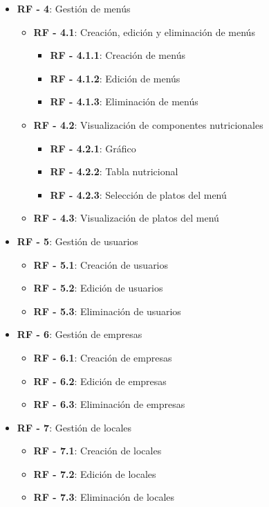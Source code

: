 \begin{itemize}
	\item \textbf{RF - 4}: Gestión de menús
	\begin{itemize}
		\item \textbf{RF - 4.1}: Creación, edición y eliminación de menús
		\begin{itemize}
			\item \textbf{RF - 4.1.1}: Creación de menús
			\item \textbf{RF - 4.1.2}: Edición de menús
			\item \textbf{RF - 4.1.3}: Eliminación de menús
		\end{itemize}
		\item \textbf{RF - 4.2}: Visualización de componentes nutricionales
		\begin{itemize}
			\item \textbf{RF - 4.2.1}: Gráfico
			\item \textbf{RF - 4.2.2}: Tabla nutricional
			\item \textbf{RF - 4.2.3}: Selección de platos del menú
		\end{itemize}
		\item \textbf{RF - 4.3}: Visualización de platos del menú
	\end{itemize}
	
	\item \textbf{RF - 5}: Gestión de usuarios
	\begin{itemize}
		\item \textbf{RF - 5.1}: Creación de usuarios
		\item \textbf{RF - 5.2}: Edición de usuarios
		\item \textbf{RF - 5.3}: Eliminación de usuarios
	\end{itemize}
	
	\item \textbf{RF - 6}: Gestión de empresas
	\begin{itemize}
		\item \textbf{RF - 6.1}: Creación de empresas
		\item \textbf{RF - 6.2}: Edición de empresas
		\item \textbf{RF - 6.3}: Eliminación de empresas
	\end{itemize}
	
	\item \textbf{RF - 7}: Gestión de locales
	\begin{itemize}
		\item \textbf{RF - 7.1}: Creación de locales
		\item \textbf{RF - 7.2}: Edición de locales
		\item \textbf{RF - 7.3}: Eliminación de locales
	\end{itemize}
	

\end{itemize}
